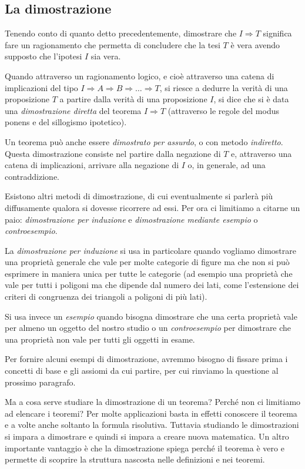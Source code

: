 \subsection{La dimostrazione}

Tenendo conto di quanto detto precedentemente, dimostrare che $I\Rightarrow T$ significa fare un ragionamento che permetta di concludere che la tesi $T$ è vera avendo supposto che l'ipotesi $I$ sia vera.

Quando attraverso un ragionamento logico, e cioè attraverso una catena di implicazioni del tipo  $I\Rightarrow A\Rightarrow B\Rightarrow \ldots{} \Rightarrow T$, si riesce a dedurre la verità di una proposizione $T$ a partire dalla verità di una proposizione $I$, si dice che si è data una \emph{dimostrazione diretta} del teorema $I\Rightarrow T$ (attraverso le regole del modus ponens e del sillogismo ipotetico).

Un teorema può anche essere \emph{dimostrato per assurdo}, o con metodo \emph{indiretto}. Questa dimostrazione consiste nel partire dalla negazione di $T$ e, attraverso una catena di implicazioni, arrivare alla negazione di $I$ o, in generale, ad una contraddizione.

Esistono altri metodi di dimostrazione, di cui eventualmente si parlerà più diffusamente qualora si dovesse ricorrere ad essi. Per ora ci limitiamo a citarne un paio: \emph{dimostrazione per induzione} e \emph{dimostrazione mediante esempio} o \emph{controesempio}.

La \emph{dimostrazione per induzione} si usa in particolare quando vogliamo dimostrare una proprietà generale che vale per molte categorie di figure ma che non si può esprimere in maniera unica per tutte le categorie (ad esempio una proprietà che vale per tutti i poligoni ma che dipende dal numero dei lati, come l'estensione dei criteri di congruenza dei triangoli a poligoni di più lati).

Si usa invece un \emph{esempio} quando bisogna dimostrare che una certa proprietà vale per almeno un oggetto del nostro studio o un \emph{controesempio} per dimostrare che una proprietà non vale per tutti gli oggetti in esame.

Per fornire alcuni esempi di dimostrazione, avremmo bisogno di fissare prima i concetti di base e gli assiomi da cui partire, per cui rinviamo la questione al prossimo paragrafo.

Ma a cosa serve studiare la dimostrazione di un teorema? Perché non ci limitiamo ad elencare i teoremi? Per molte applicazioni basta in effetti conoscere il teorema e a volte anche soltanto la formula risolutiva. Tuttavia studiando le dimostrazioni si impara a dimostrare e quindi si impara a creare nuova matematica. Un altro importante vantaggio è che la dimostrazione spiega perché il teorema è vero e permette di scoprire la struttura nascosta nelle definizioni e nei teoremi.

